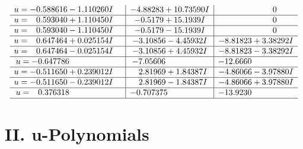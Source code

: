 \documentclass[1p]{elsarticle_modified}
\theoremstyle{definition}
\begin{document}
$$\begin{array}{c|c|c}
\begin{aligned}
u &= -0.588616 - 1.110260 I\end{aligned}
 & -4.88283 + 10.73590 I & \phantom{-0.000000 } 0 \\ \hline\begin{aligned}
u &= \phantom{-}0.593040 + 1.110450 I\end{aligned}
 & -0.5179 + 15.1939 I & \phantom{-0.000000 } 0 \\ \hline\begin{aligned}
u &= \phantom{-}0.593040 - 1.110450 I\end{aligned}
 & -0.5179 - 15.1939 I & \phantom{-0.000000 } 0 \\ \hline\begin{aligned}
u &= \phantom{-}0.647464 + 0.025154 I\end{aligned}
 & -3.10856 - 4.45932 I & -8.81823 + 3.38292 I \\ \hline\begin{aligned}
u &= \phantom{-}0.647464 - 0.025154 I\end{aligned}
 & -3.10856 + 4.45932 I & -8.81823 - 3.38292 I \\ \hline\begin{aligned}
u &= -0.647786\phantom{ +0.000000I}\end{aligned}
 & -7.05606\phantom{ +0.000000I} & -12.6660\phantom{ +0.000000I} \\ \hline\begin{aligned}
u &= -0.511650 + 0.239012 I\end{aligned}
 & \phantom{-}2.81969 + 1.84387 I & -4.86066 - 3.97880 I \\ \hline\begin{aligned}
u &= -0.511650 - 0.239012 I\end{aligned}
 & \phantom{-}2.81969 - 1.84387 I & -4.86066 + 3.97880 I \\ \hline\begin{aligned}
u &= \phantom{-}0.376318\phantom{ +0.000000I}\end{aligned}
 & -0.707375\phantom{ +0.000000I} & -13.9230\phantom{ +0.000000I}\\
 \hline 
 \end{array}$$\newpage
\newpage\renewcommand{\arraystretch}{1}
\centering \section*{ II. u-Polynomials}
\end{document}
